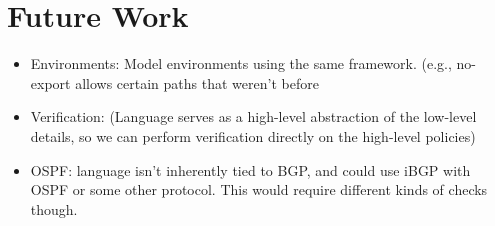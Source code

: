\section{Future Work}

\begin{itemize}
	\item Environments: Model environments using the same framework. (e.g., no-export allows certain paths that weren't before
	\item Verification: (Language serves as a high-level abstraction of the low-level details, so we can perform verification directly on the high-level policies)
	\item OSPF: language isn't inherently tied to BGP, and could use iBGP with OSPF or some other protocol. This would require different kinds of checks though.
\end{itemize}

